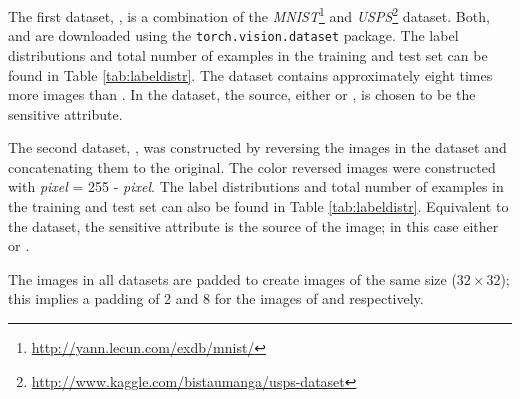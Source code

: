 The first dataset, \USPSMNIST, is a combination of the \textit{MNIST}\footnote{\url{http://yann.lecun.com/exdb/mnist/}} and \textit{USPS}\footnote{\url{http://www.kaggle.com/bistaumanga/usps-dataset}} dataset. Both, \mn and \usps are downloaded using the \texttt{torch.vision.dataset} package. The label distributions and total number of examples in the training and test set can be found in Table \ref{tab:labeldistr}. The \mn dataset contains approximately eight times more images than \usps. In the \USPSMNIST dataset, the source, either \mn or \usps, is chosen to be the sensitive attribute. 

The second dataset, \revMNIST, was constructed by reversing the images in the \mn dataset and concatenating them to the original. The color reversed images were constructed with \textit{pixel} = 255 - \textit{pixel}. The label distributions and total number of examples in the training and test set can also be found in Table \ref{tab:labeldistr}. Equivalent to the \USPSMNIST dataset, the sensitive attribute is the source of the image; in this case either \mn or \rmn.

The images in all datasets are padded to create images of the same size ($32\times 32$); this implies a padding of 2 and 8 for the images of \mn and \usps respectively.




